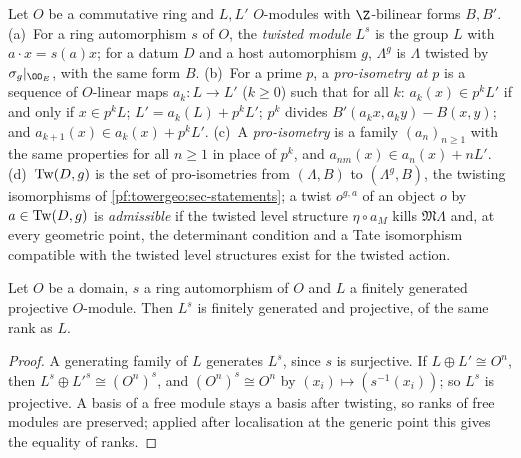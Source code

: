 \begin{definition}\label{pf:tower:def-twist}
Let $O$ be a commutative ring and $L,L'$ $O$-modules with $\Z$-bilinear forms $B,B'$.
(a)~For a ring automorphism $s$ of $O$, the \emph{twisted module} $L^s$ is the group $L$ with $a\cdot x=s(a)x$; for a datum
$D$ and a host automorphism $g$, $\Lambda^g$ is $\Lambda$ twisted by $\sigma_g|_{\OO_E}$, with the same form $B$.
(b)~For a prime $p$, a \emph{pro-isometry at $p$} is a sequence of $O$-linear maps $a_k\colon L\to L'$ ($k\ge0$) such that for
all $k$: $a_k(x)\in p^kL'$ if and only if $x\in p^kL$; $L'=a_k(L)+p^kL'$; $p^k$ divides $B'(a_kx,a_ky)-B(x,y)$; and
$a_{k+1}(x)\in a_k(x)+p^kL'$.
(c)~A \emph{pro-isometry} is a family $(a_n)_{n\ge1}$ with the same properties for all $n\ge1$ in place of $p^k$, and
$a_{nm}(x)\in a_n(x)+nL'$.
(d)~$\mathrm{Tw}(D,g)$ is the set of pro-isometries from $(\Lambda,B)$ to $(\Lambda^g,B)$, the twisting isomorphisms of
\cref{pf:towergeo:sec-statements}; a twist $o^{g,a}$ of an object $o$ by $a\in\mathrm{Tw}(D,g)$ is \emph{admissible} if the
twisted level structure $\eta\circ a_M$ kills $\mathfrak M\Lambda$ and, at every geometric point, the determinant condition and
a Tate isomorphism compatible with the twisted level structures exist for the twisted action.
\end{definition}

\begin{lemma}\label{pf:tower:twmod}
Let $O$ be a domain, $s$ a ring automorphism of $O$ and $L$ a finitely generated projective $O$-module. Then $L^s$ is finitely
generated and projective, of the same rank as $L$.
\end{lemma}

\begin{proof}
A generating family of $L$ generates $L^s$, since $s$ is surjective. If $L\oplus L'\cong O^n$, then
$L^s\oplus L'^s\cong(O^n)^s$, and $(O^n)^s\cong O^n$ by $(x_i)\mapsto(s^{-1}(x_i))$; so $L^s$ is projective. A basis of a free
module stays a basis after twisting, so ranks of free modules are preserved; applied after localisation at the generic point
this gives the equality of ranks.
\end{proof}

